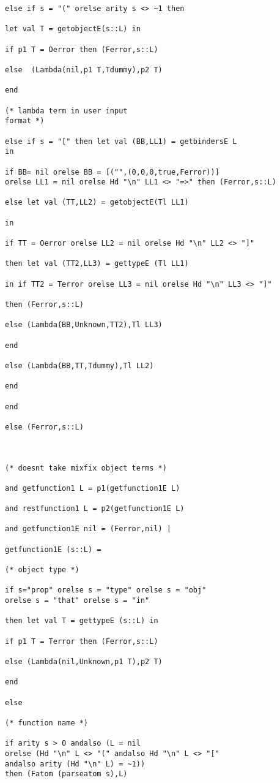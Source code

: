 \documentclass[12pt]{article}
\begin{document}
\begin{verbatim}
else if s = "(" orelse arity s <> ~1 then

let val T = getobjectE(s::L) in

if p1 T = Oerror then (Ferror,s::L)

else  (Lambda(nil,p1 T,Tdummy),p2 T)

end

(* lambda term in user input
format *)

else if s = "[" then let val (BB,LL1) = getbindersE L
in

if BB= nil orelse BB = [("",(0,0,0,true,Ferror))]
orelse LL1 = nil orelse Hd "\n" LL1 <> "=>" then (Ferror,s::L)

else let val (TT,LL2) = getobjectE(Tl LL1) 

in

if TT = Oerror orelse LL2 = nil orelse Hd "\n" LL2 <> "]"

then let val (TT2,LL3) = gettypeE (Tl LL1)

in if TT2 = Terror orelse LL3 = nil orelse Hd "\n" LL3 <> "]"

then (Ferror,s::L)

else (Lambda(BB,Unknown,TT2),Tl LL3)

end

else (Lambda(BB,TT,Tdummy),Tl LL2)

end

end

else (Ferror,s::L)



(* doesnt take mixfix object terms *)

and getfunction1 L = p1(getfunction1E L)

and restfunction1 L = p2(getfunction1E L)

and getfunction1E nil = (Ferror,nil) |

getfunction1E (s::L) =

(* object type *)

if s="prop" orelse s = "type" orelse s = "obj"
orelse s = "that" orelse s = "in"

then let val T = gettypeE (s::L) in

if p1 T = Terror then (Ferror,s::L)

else (Lambda(nil,Unknown,p1 T),p2 T)

end

else

(* function name *)

if arity s > 0 andalso (L = nil 
orelse (Hd "\n" L <> "(" andalso Hd "\n" L <> "["
andalso arity (Hd "\n" L) = ~1))
then (Fatom (parseatom s),L)


\end{verbatim}
\end{document}
